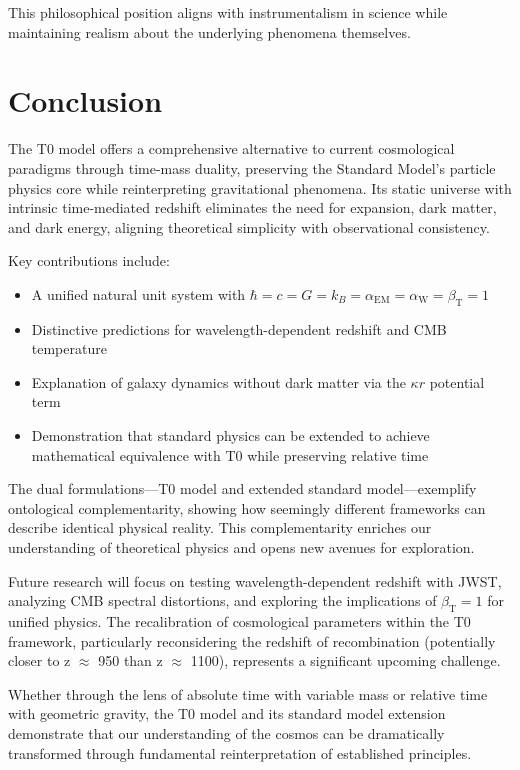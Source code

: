 \documentclass[twocolumn,aps,prl]{revtex4-2}
\newcommand{\alphaEM}{\alpha_{\text{EM}}}
\newcommand{\alphaW}{\alpha_{\text{W}}}
\newcommand{\betaT}{\beta_{\text{T}}}
\begin{document}
	This philosophical position aligns with instrumentalism in science while maintaining realism about the underlying phenomena themselves.
	
	\section{Conclusion}
	\label{sec:conclusion}
	
	The T0 model offers a comprehensive alternative to current cosmological paradigms through time-mass duality, preserving the Standard Model's particle physics core while reinterpreting gravitational phenomena. Its static universe with intrinsic time-mediated redshift eliminates the need for expansion, dark matter, and dark energy, aligning theoretical simplicity with observational consistency.
	
	Key contributions include:
	\begin{itemize}
		\item A unified natural unit system with \(\hbar = c = G = k_B = \alphaEM = \alphaW = \betaT = 1\)
		\item Distinctive predictions for wavelength-dependent redshift and CMB temperature
		\item Explanation of galaxy dynamics without dark matter via the \(\kappa r\) potential term
		\item Demonstration that standard physics can be extended to achieve mathematical equivalence with T0 while preserving relative time
	\end{itemize}
	
	The dual formulations—T0 model and extended standard model—exemplify ontological complementarity, showing how seemingly different frameworks can describe identical physical reality. This complementarity enriches our understanding of theoretical physics and opens new avenues for exploration.
	
	Future research will focus on testing wavelength-dependent redshift with JWST, analyzing CMB spectral distortions, and exploring the implications of \(\betaT = 1\) for unified physics. The recalibration of cosmological parameters within the T0 framework, particularly reconsidering the redshift of recombination (potentially closer to z $\approx$ 950 than z $\approx$ 1100), represents a significant upcoming challenge.
	
	Whether through the lens of absolute time with variable mass or relative time with geometric gravity, the T0 model and its standard model extension demonstrate that our understanding of the cosmos can be dramatically transformed through fundamental reinterpretation of established principles.
	
\end{document}
